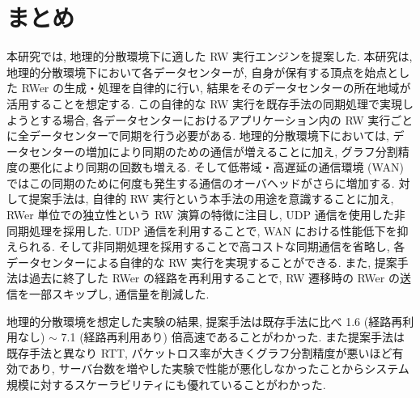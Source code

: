 \section{まとめ}



本研究では, 地理的分散環境下に適した RW 実行エンジンを提案した. 本研究は, 地理的分散環境下において各データセンターが, 自身が保有する頂点を始点とした RWer の生成・処理を自律的に行い, 結果をそのデータセンターの所在地域が活用することを想定する. この自律的な RW 実行を既存手法の同期処理で実現しようとする場合, 各データセンターにおけるアプリケーション内の RW 実行ごとに全データセンターで同期を行う必要がある. 地理的分散環境下においては, データセンターの増加により同期のための通信が増えることに加え, グラフ分割精度の悪化により同期の回数も増える. そして低帯域・高遅延の通信環境 (WAN) ではこの同期のために何度も発生する通信のオーバヘッドがさらに増加する. 対して提案手法は, 自律的 RW 実行という本手法の用途を意識することに加え, RWer 単位での独立性という RW 演算の特徴に注目し, UDP 通信を使用した非同期処理を採用した. UDP 通信を利用することで, WAN における性能低下を抑えられる. そして非同期処理を採用することで高コストな同期通信を省略し, 各データセンターによる自律的な RW 実行を実現することができる. また, 提案手法は過去に終了した RWer の経路を再利用することで, RW 遷移時の RWer の送信を一部スキップし, 通信量を削減した. 

地理的分散環境を想定した実験の結果, 提案手法は既存手法に比べ 1.6 (経路再利用なし) $\sim$ 7.1 (経路再利用あり) 倍高速であることがわかった. また提案手法は既存手法と異なり RTT, パケットロス率が大きくグラフ分割精度が悪いほど有効であり, サーバ台数を増やした実験で性能が悪化しなかったことからシステム規模に対するスケーラビリティにも優れていることがわかった. 

